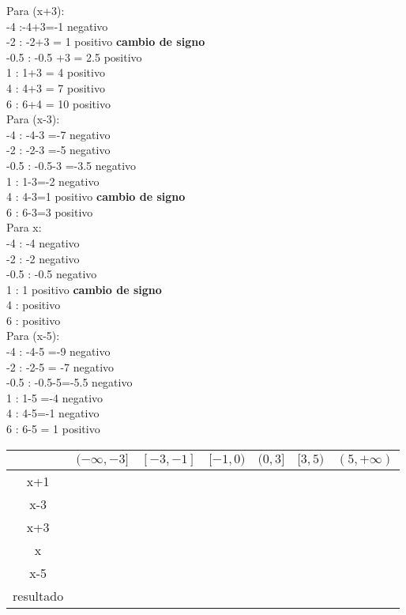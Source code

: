     Para (x+3):\\
    -4 :-4+3=-1 negativo\\
    -2 : -2+3 = 1 positivo \textbf{cambio de signo}\\
    -0.5 : -0.5 +3 = 2.5 positivo\\
    1 : 1+3 = 4 positivo\\
    4 : 4+3 = 7 positivo\\
    6 : 6+4 = 10 positivo\\

    Para (x-3):\\
    -4 : -4-3 =-7 negativo\\
    -2 : -2-3 =-5 negativo\\
    -0.5 : -0.5-3 =-3.5 negativo\\
    1 : 1-3=-2 negativo\\
    4 : 4-3=1 positivo \textbf{cambio de signo}\\
    6 : 6-3=3 positivo\\

    Para x:\\
    -4 : -4 negativo\\
    -2 : -2 negativo\\
    -0.5 : -0.5 negativo\\
    1 : 1 positivo  \textbf{cambio de signo}\\
    4 : positivo\\
    6 : positivo\\

    Para (x-5):\\
    -4 : -4-5 =-9 negativo\\
    -2 : -2-5 = -7 negativo\\
    -0.5 : -0.5-5=-5.5 negativo\\
    1 : 1-5 =-4 negativo\\
    4 : 4-5=-1 negativo \\
    6 : 6-5 = 1 positivo\\


\vspace*{1cm}
    \begin{tabular}{|c|c|c|c|c|c|c|}
        \hline
            &$ (-\infty,-3]$&   $[-3,-1]$ &$ [-1,0) $ &$(0,3]$& $ [3,5) $& $(5,+\infty)$\\\hline
        x+1 &  \n   & \n    & \p    & \p    & \p    & \p \\\hline
        x-3 & \n    & \n    & \n    & \n    & \p    & \p \\\hline
        x+3 & \n    & \p    & \p    & \p    & \p    & \p \\\hline
        x   & \n    &  \n   & \n    & \p    & \p    & \p \\\hline
        x-5 & \n    &  \n   & \n    & \n    & \n    & \p \\\hline
    resultado& \n   & \p    & \n    & \p    & \n    & \p \\\hline
    \end{tabular}
    \vspace*{1cm}

